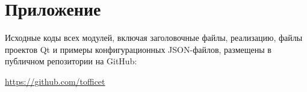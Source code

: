 \documentclass[a4paper]{article}
\theoremstyle{definition}
\begin{document}
\section*{Приложение}

Исходные коды всех модулей, включая заголовочные файлы, реализацию, файлы проектов Qt и примеры конфигурационных JSON-файлов, размещены в публичном репозитории на GitHub:

\url{https://github.com/tofficet}
\end{document}
